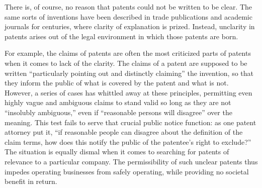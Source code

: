 \documentclass[11pt,twocolumn,titlepage]{article}
\begin{document}
There is, of course, no reason that patents could not be written to be clear.
The same sorts of inventions have been described in trade publications and
academic journals for centuries, where clarity of explanation is prized.
Instead, unclarity in patents arises out of the legal environment in which
those patents are born.

For example, the claims of patents are often the most criticized parts of
patents when it comes to lack of the clarity. The claims of a patent are
supposed to be written ``particularly pointing out and distinctly claiming'' the
invention, so that they inform the public of what is
covered by the
patent and what is not. However, a series of cases has whittled away at
these principles, permitting even highly vague and ambiguous claims to stand
valid so long as they are not ``insolubly ambiguous,'' even if ``reasonable
persons will disagree'' over the meaning. This test fails to serve that crucial public notice function: as one
patent attorney put it, ``if reasonable people can disagree about the definition
of the claim terms, how does this notify the public of the patentee's right to
exclude?'' The situation is equally dismal when it comes to searching for
patents of relevance to a particular company.
The permissibility of such unclear patents thus impedes operating businesses
from safely operating, while providing no societal benefit in return.
\end{document}
